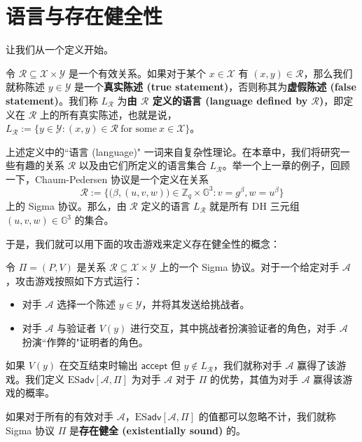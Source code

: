 \section{语言与存在健全性}\label{sec:20-1}

让我们从一个定义开始。

\begin{definition}[真实陈述的语言]
令 $\mathcal{R}\subseteq\mathcal{X}\times\mathcal{Y}$ 是一个有效关系。如果对于某个 $x\in\mathcal{X}$ 有 $(x,y)\in\mathcal{R}$，那么我们就称陈述 $y\in\mathcal{Y}$ 是一个\textbf{真实陈述 (true statement)}，否则称其为\textbf{虚假陈述 (false statement)}。我们称 $L_{\mathcal{R}}$ 为\textbf{由 $\mathcal{R}$ 定义的语言 (language defined by $\mathcal{R}$)}，即定义在 $\mathcal{R}$ 上的所有真实陈述，也就是说，$L_{\mathcal{R}}:=\{y\in\mathcal{Y}:(x,y)\in\mathcal{R}~\text{for some}~x\in\mathcal{X}\}$。
\end{definition}

上述定义中的``语言 (language)" 一词来自复杂性理论。在本章中，我们将研究一些有趣的关系 $\mathcal{R}$ 以及由它们所定义的语言集合 $L_{\mathcal{R}}$。举一个上一章的例子，回顾一下，Chaum-Pedersen 协议是一个定义在关系
$$
\mathcal{R}:=\bigg\lbrace
\big(\beta, (u,v,w)\big)\in\mathbb{Z}_q\times\mathbb{G}^3:v=g^\beta, w=u^\beta
\bigg\rbrace
$$
上的 Sigma 协议。那么，由 $\mathcal{R}$ 定义的语言 $L_{\mathcal{R}}$ 就是所有 DH 三元组 $(u,v,w)\in\mathbb{G}^3$ 的集合。

于是，我们就可以用下面的攻击游戏来定义存在健全性的概念：

\begin{game}[存在健全性]\label{game:20-1}
令 $\Pi=(P,V)$ 是关系 $\mathcal{R}\subseteq\mathcal{X}\times\mathcal{Y}$ 上的一个 Sigma 协议。对于一个给定对手 $\mathcal{A}$，攻击游戏按照如下方式运行：
\begin{itemize}
	\item 对手 $\mathcal{A}$ 选择一个陈述 $y\in\mathcal{Y}$，并将其发送给挑战者。
	\item 对手 $\mathcal{A}$ 与验证者 $V(y)$ 进行交互，其中挑战者扮演验证者的角色，对手 $\mathcal{A}$ 扮演``作弊的"证明者的角色。
\end{itemize}
如果 $V(y)$ 在交互结束时输出 $\mathsf{accept}$ 但 $y\notin L_{\mathcal{R}}$，我们就称对手 $\mathcal{A}$ 赢得了该游戏。我们定义 $\mathrm{ES}\mathsf{adv}[\mathcal{A},{\Pi}]$ 为对手 $\mathcal{A}$ 对于 $\Pi$ 的优势，其值为对手 $\mathcal{A}$ 赢得该游戏的概率。
\end{game}

\begin{definition}
如果对于所有的有效对手 $\mathcal{A}$，$\mathrm{ES}\mathsf{adv}[\mathcal{A},{\Pi}]$ 的值都可以忽略不计，我们就称 Sigma 协议 $\Pi$ 是\textbf{存在健全 (existentially sound)} 的。
\end{definition}

